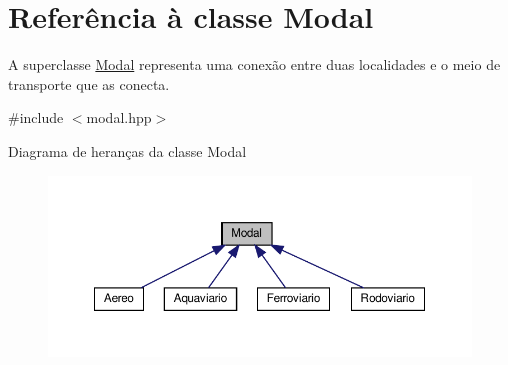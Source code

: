 \hypertarget{classModal}{}\section{Referência à classe Modal}
\label{classModal}


A superclasse \hyperlink{classModal}{Modal} representa uma conexão entre duas localidades e o meio de transporte que as conecta.  




{\ttfamily \#include $<$modal.\+hpp$>$}



Diagrama de heranças da classe Modal\nopagebreak
\begin{figure}[H]
\begin{center}
\leavevmode
\includegraphics[width=350pt]{classModal__inherit__graph}
\end{center}
\end{figure}
